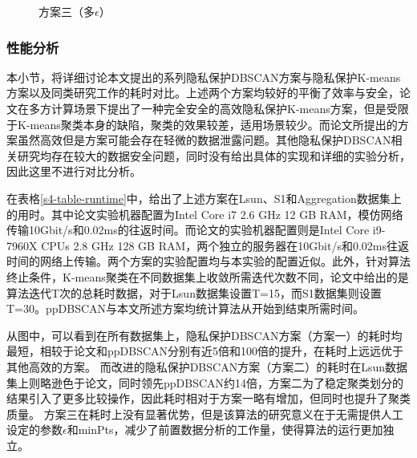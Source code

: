 \begin{figure}[htbp]
\begin{minipage}[t]{0.33\linewidth}
	\caption{方案三（多$ \epsilon $）}
	\label{dbhcexp3}
	\end{minipage}
\end{figure}\textbf{}

\subsubsection{性能分析}
本小节，将详细讨论本文提出的系列隐私保护DBSCAN方案与隐私保护K-means方案\cite{mohassel2019practical}以及同类研究工作\cite{bozdemir2021privacy}的耗时对比。上述两个方案均较好的平衡了效率与安全，论文\cite{mohassel2019practical}在多方计算场景下提出了一种完全安全的高效隐私保护K-means方案，但是受限于K-means聚类本身的缺陷，聚类的效果较差，适用场景较少。而论文\cite{bozdemir2021privacy}所提出的方案虽然高效但是方案可能会存在轻微的数据泄露问题。其他隐私保护DBSCAN相关研究均存在较大的数据安全问题，同时没有给出具体的实现和详细的实验分析，因此这里不进行对比分析。

在表格\ref{s4-table-runtime}中，给出了上述方案在Lsun、S1和Aggregation数据集上的用时。其中论文\cite{mohassel2019practical}实验机器配置为Intel Core i7 2.6 GHz 12 GB RAM，模仿网络传输10Gbit/s和0.02ms的往返时间。而论文\cite{bozdemir2021privacy}的实验机器配置则是Intel Core i9-7960X CPUs 2.8 GHz 128 GB RAM，两个独立的服务器在10Gbit/s和0.02ms往返时间的网络上传输。两个方案的实验配置均与本实验的配置近似。此外，针对算法终止条件，K-means聚类在不同数据集上收敛所需迭代次数不同，论文\cite{mohassel2019practical}中给出的是算法迭代T次的总耗时数据，对于Lsun数据集设置T=15，而S1数据集则设置T=30。ppDBSCAN\cite{bozdemir2021privacy}与本文所述方案均统计算法从开始到结束所需时间。

从图中，可以看到在所有数据集上，隐私保护DBSCAN方案（方案一）的耗时均最短，相较于论文\cite{mohassel2019practical}和ppDBSCAN分别有近5倍和100倍的提升，在耗时上远远优于其他高效的方案。
而改进的隐私保护DBSCAN方案（方案二）的耗时在Lsun数据集上则略逊色于论文\cite{mohassel2019practical}，同时领先ppDBSCAN约14倍，方案二为了稳定聚类划分的结果引入了更多比较操作，因此耗时相对于方案一略有增加，但同时也提升了聚类质量。
方案三在耗时上没有显著优势，但是该算法的研究意义在于无需提供人工设定的参数$\epsilon$和minPts，减少了前置数据分析的工作量，使得算法的运行更加独立。

